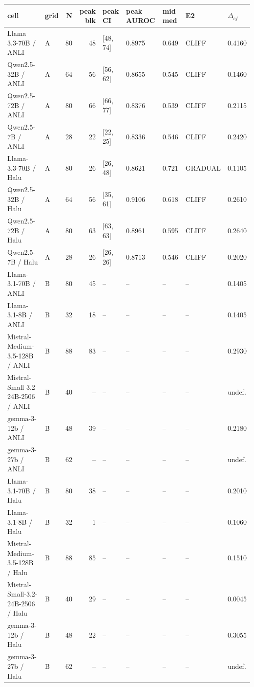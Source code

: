 \begin{tabular}{llrrlllll}
\toprule
cell & grid & N & peak blk & peak CI & peak AUROC & mid med & E2 & $\Delta_{cf}$ \\
\midrule
Llama-3.3-70B / ANLI & A & 80 & 48 & [48, 74] & 0.8975 & 0.649 & CLIFF & 0.4160 \\
Qwen2.5-32B / ANLI & A & 64 & 56 & [56, 62] & 0.8655 & 0.545 & CLIFF & 0.1460 \\
Qwen2.5-72B / ANLI & A & 80 & 66 & [66, 77] & 0.8376 & 0.539 & CLIFF & 0.2115 \\
Qwen2.5-7B / ANLI & A & 28 & 22 & [22, 25] & 0.8336 & 0.546 & CLIFF & 0.2420 \\
Llama-3.3-70B / Halu & A & 80 & 26 & [26, 48] & 0.8621 & 0.721 & GRADUAL & 0.1105 \\
Qwen2.5-32B / Halu & A & 64 & 56 & [35, 61] & 0.9106 & 0.618 & CLIFF & 0.2610 \\
Qwen2.5-72B / Halu & A & 80 & 63 & [63, 63] & 0.8961 & 0.595 & CLIFF & 0.2640 \\
Qwen2.5-7B / Halu & A & 28 & 26 & [26, 26] & 0.8713 & 0.546 & CLIFF & 0.2020 \\
Llama-3.1-70B / ANLI & B & 80 & 45 & -- & -- & -- & -- & 0.1405 \\
Llama-3.1-8B / ANLI & B & 32 & 18 & -- & -- & -- & -- & 0.1405 \\
Mistral-Medium-3.5-128B / ANLI & B & 88 & 83 & -- & -- & -- & -- & 0.2930 \\
Mistral-Small-3.2-24B-2506 / ANLI & B & 40 & -- & -- & -- & -- & -- & undef. \\
gemma-3-12b / ANLI & B & 48 & 39 & -- & -- & -- & -- & 0.2180 \\
gemma-3-27b / ANLI & B & 62 & -- & -- & -- & -- & -- & undef. \\
Llama-3.1-70B / Halu & B & 80 & 38 & -- & -- & -- & -- & 0.2010 \\
Llama-3.1-8B / Halu & B & 32 & 1 & -- & -- & -- & -- & 0.1060 \\
Mistral-Medium-3.5-128B / Halu & B & 88 & 85 & -- & -- & -- & -- & 0.1510 \\
Mistral-Small-3.2-24B-2506 / Halu & B & 40 & 29 & -- & -- & -- & -- & 0.0045 \\
gemma-3-12b / Halu & B & 48 & 22 & -- & -- & -- & -- & 0.3055 \\
gemma-3-27b / Halu & B & 62 & -- & -- & -- & -- & -- & undef. \\
\bottomrule
\end{tabular}
